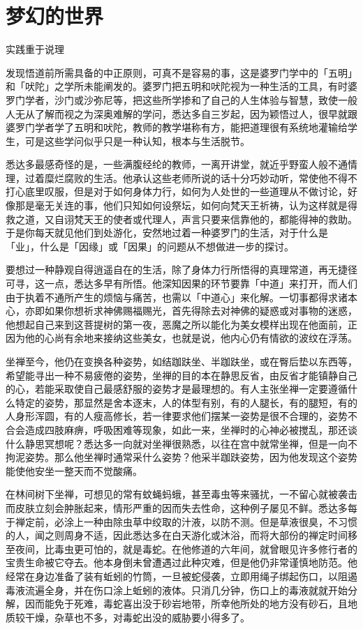 \documentclass[12pt,twoside,openany]{book}
\begin{document}
\section{梦幻的世界}\label{sec1.14}

实践重于说理

发现悟道前所需具备的中正原则，可真不是容易的事，这是婆罗门学中的「五明」和「吠陀」之学所未能阐发的。婆罗门把五明和吠陀视为一种生活的工具，有时婆罗门学者，沙门或沙弥尼等，把这些所学掺和了自己的人生体验与智慧，致使一般人无从了解而视之为深奥难解的学问，悉达多自三岁起，因为颖悟过人，很早就跟婆罗门学者学了五明和吠陀，教师的教学堪称有方，能把道理很有系统地灌输给学生，可是这些学问似乎只是一种认知，根本与生活脱节。

悉达多最感奇怪的是，一些满腹经纶的教师，一离开讲堂，就近乎野蛮人般不通情理，过着糜烂腐败的生活。他承认这些老师所说的话十分巧妙动听，常使他不得不打心底里叹服，但是对于如何身体力行，如何为人处世的一些道理从不做讨论，好像那是毫无关连的事，他们只知如何设祭坛，如何向梵天王祈祷，认为这样就是得救之道，又自诩梵天王的使者或代理人，声言只要来信靠他的，都能得神的救助。于是你每天就见他们到处游化，安然地过着一种婆罗门的生活，对于什么是「业」，什么是「因缘」或「因果」的问题从不想做进一步的探讨。

要想过一种静观自得逍遥自在的生活，除了身体力行所悟得的真理常道，再无捷径可寻，这一点，悉达多早有所悟。他深知因果的环节要靠「中道」来打开，而人们由于执着不通所产生的烦恼与痛苦，也需以「中道心」来化解。一切事都得求诸本心，亦即如果你想祈求神佛赐福赐光，首先得除去对神佛的疑惑或对事物的迷惑，他想起自己来到这菩提树的第一夜，恶魔之所以能化为美女模样出现在他面前，正因为他的心尚有余地来接纳这些美女，也就是说，他内心仍有情欲的波纹在浮荡。

坐禅至今，他仍在变换各种姿势，如结跏趺坐、半跏趺坐，或在臀后垫以东西等，希望能寻出一种不易疲倦的姿势，坐禅的目的本在静思反省，由反省才能镇静自己的心，若能采取使自己最感舒服的姿势才是最理想的。有人主张坐禅一定要遵循什么特定的姿势，那显然是舍本逐末，人的体型有别，有的人腿长，有的腿短，有的人身形浑圆，有的人瘦高修长，若一律要求他们摆某一姿势是很不合理的，姿势不合会造成四肢麻痹，呼吸困难等现象，如此一来，坐禅时的心神必被搅乱，那还谈什么静思冥想呢？悉达多一向就对坐禅很熟悉，以往在宫中就常坐禅，但是一向不拘泥姿势。那么他坐禅时通常采什么姿势？他采半跏趺姿势，因为他发现这个姿势能使他安坐一整天而不觉酸痛。

在林间树下坐禅，可想见的常有蚊蝇蚂蛾，甚至毒虫等来骚扰，一不留心就被袭击而皮肤立刻会肿胀起来，情形严重的因而失去性命，这种例子屡见不鲜。悉达多每于禅定前，必涂上一种由除虫草中绞取的汁液，以防不测。但是草液很臭，不习惯的人，闻之则周身不适，因此悉达多在白天游化或沐浴，而将大部份的禅定时间移至夜间，比毒虫更可怕的，就是毒蛇。在他修道的六年间，就曾眼见许多修行者的宝贵生命被它夺去。他本身倒未曾遭遇过此种灾难，但是他仍非常谨慎地防范。他经常在身边准备了装有蚯蚓的竹筒，一旦被蛇侵袭，立即用绳子绑起伤口，以阻遏毒液流遍全身，并在伤口涂上蚯蚓的液体。只消几分钟，伤口上的毒液就就开始分解，因而能免于死难，毒蛇喜出没于砂岩地带，所幸他所处的地方没有砂石，且地质较干燥，杂草也不多，对毒蛇出没的威胁要小得多了。
\end{document}
